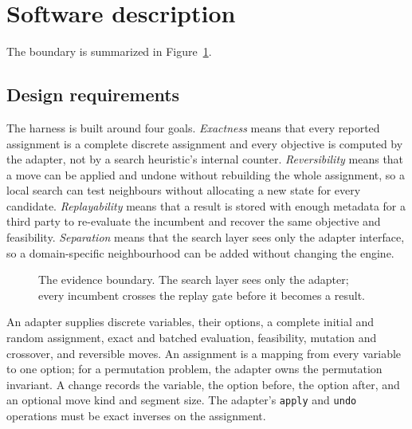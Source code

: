 \documentclass[10pt]{article}
\begin{document}
\section{Software description}

The boundary is summarized in Figure~\ref{fig:architecture}.

\subsection{Design requirements}

The harness is built around four goals. \emph{Exactness} means that every reported assignment is a
complete discrete assignment and every objective is computed by the adapter, not by a search
heuristic's internal counter. \emph{Reversibility} means that a move can be applied and undone
without rebuilding the whole assignment, so a local search can test neighbours without allocating a
new state for every candidate. \emph{Replayability} means that a result is stored with enough
metadata for a third party to re-evaluate the incumbent and recover the same objective and
feasibility. \emph{Separation} means that the search layer sees only the adapter interface, so a
domain-specific neighbourhood can be added without changing the engine.

\begin{figure}[H]
\centering
{}
\caption{The evidence boundary. The search layer sees only the adapter; every incumbent crosses the
replay gate before it becomes a result.}
\label{fig:architecture}
\end{figure}

An adapter supplies discrete variables, their options, a complete initial and random assignment,
exact and batched evaluation, feasibility, mutation and crossover, and reversible moves. An
assignment is a mapping from every variable to one option; for a permutation problem, the adapter
owns the permutation invariant. A change records the variable, the option before, the option after,
and an optional move kind and segment size. The adapter's \texttt{apply} and \texttt{undo}
operations must be exact inverses on the assignment.
\end{document}
